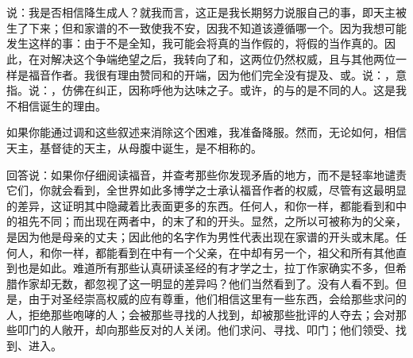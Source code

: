 
\section{}

\par

说：我是否相信降生成人？就我而言，这正是我长期努力说服自己的事，即天主被生了下来；但和家谱的不一致使我不安，因我不知道该遵循哪一个。因为我想可能发生这样的事：由于不是全知，我可能会将真的当作假的，将假的当作真的。因此，在对解决这个争端绝望之后，我转向了和，这两位仍然权威，且与其他两位一样是福音作者。我很有理由赞同和的开端，因为他们完全没有提及、或。说：，意指。说：，仿佛在纠正，因称呼他为达味之子。或许，的与的是不同的人。这是我不相信诞生的理由。\par

如果你能通过调和这些叙述来消除这个困难，我准备降服。然而，无论如何，相信天主，基督徒的天主，从母腹中诞生，是不相称的。\par

回答说：如果你仔细阅读福音，并查考那些你发现矛盾的地方，而不是轻率地谴责它们，你就会看到，全世界如此多博学之士承认福音作者的权威，尽管有这最明显的差异，这证明其中隐藏着比表面更多的东西。任何人，和你一样，都能看到和中的祖先不同；而出现在两者中，的末了和的开头。显然，之所以可被称为的父亲，是因为他是母亲的丈夫；因此他的名字作为男性代表出现在家谱的开头或末尾。任何人，和你一样，都能看到在中有一个父亲，在中却有另一个，祖父和所有其他直到也是如此。难道所有那些认真研读圣经的有才学之士，拉丁作家确实不多，但希腊作家却无数，都忽视了这一明显的差异吗？他们当然看到了。没有人看不到。但是，由于对圣经崇高权威的应有尊重，他们相信这里有一些东西，会给那些求问的人，拒绝那些咆哮的人；会被那些寻找的人找到，却被那些批评的人夺去；会对那些叩门的人敞开，却向那些反对的人关闭。他们求问、寻找、叩门；他们领受、找到、进入。\par

